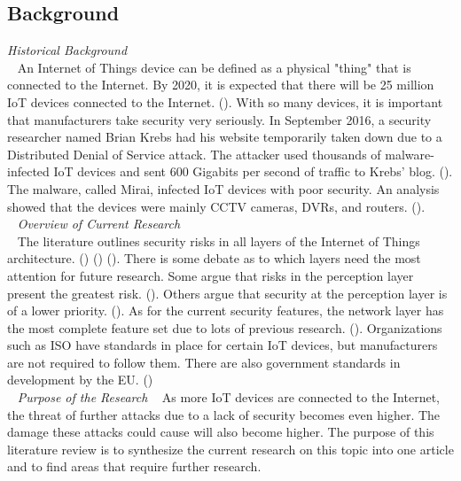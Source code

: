 \documentclass[letterpaper, 12pt]{texMemo}
\begin{document}
\begin{flushleft}
\subsection*{Background}
\textit{Historical Background}\\ 
~\newline
An Internet of Things device can be defined as a physical "thing" that is connected to the Internet. By 2020, it is expected that there will be 
25 million IoT devices connected to the Internet. (\cite{Martinez1}). With so many devices, it is important that manufacturers take security very seriously. 
In September 2016, a security researcher named Brian Krebs had his website temporarily taken down due to a Distributed Denial of Service attack. The attacker
used thousands of malware-infected IoT devices and sent 600 Gigabits per second of traffic to Krebs' blog. (\cite{Krebs}). The malware, called Mirai, 
infected IoT devices with poor security. An analysis showed that the devices were mainly CCTV cameras, DVRs, and routers. (\cite{Incapsula}).\\
~\newline
\textit{Overview of Current Research}\\
~\newline
The literature outlines security risks in all layers of the Internet of Things architecture. (\cite{Xiaohui6643029}) (\cite{Zhao6746513}) (\cite{Suo6188257}). 
There is some debate as to which layers need the most attention for future research. Some argue that risks in the perception layer present the greatest risk. (\cite{Zhao6746513}).
Others argue that security at the perception layer is of a lower priority. (\cite{Kozlov}). As for the current security features, the network layer has the most
complete feature set due to lots of previous research. (\cite{Suo6188257}). Organizations such as ISO have standards in place for certain IoT devices, but manufacturers
are not required to follow them. There are also government standards in development by the EU. (\cite{Roman6017172}) \\
~\newline
\textit{Purpose of the Research}
~\newline
As more IoT devices are connected to the Internet, the threat of further attacks due to a lack of security becomes even higher. The damage these attacks could
cause will also become higher. The purpose of this literature review is to synthesize the current research on this topic into one article and to find areas that require 
further research.\\
~\newline


\end{flushleft}
\end{document}
